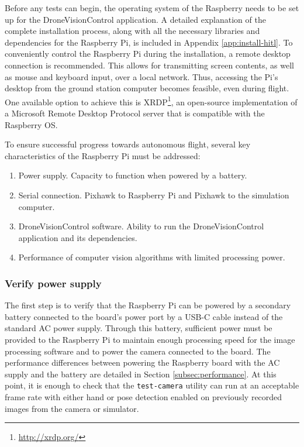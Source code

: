 Before any tests can begin, the operating system of the Raspberry needs to be set up for the DroneVisionControl application. A detailed explanation of the complete installation process, along with all the necessary libraries and dependencies for the Raspberry Pi, is included in Appendix \ref{app:install-hitl}. To conveniently control the Raspberry Pi during the installation, a remote desktop connection is recommended. This allows for transmitting screen contents, as well as mouse and keyboard input, over a local network. Thus, accessing the Pi's desktop from the ground station computer becomes feasible, even during flight. One available option to achieve this is XRDP\footnote{\url{http://xrdp.org/}}, an open-source implementation of a Microsoft Remote Desktop Protocol server that is compatible with the Raspberry OS.

To ensure successful progress towards autonomous flight, several key characteristics of the Raspberry Pi must be addressed:
\begin{enumerate}
    \item Power supply. Capacity to function when powered by a battery.
    \item Serial connection. Pixhawk to Raspberry Pi and Pixhawk to the simulation computer.
    \item DroneVisionControl software. Ability to run the DroneVisionControl application and its dependencies.
    \item Performance of computer vision algorithms with limited processing power.
\end{enumerate}


\subsubsection{Verify power supply}

The first step is to verify that the Raspberry Pi can be powered by a secondary battery connected to the board's power port by a USB-C cable instead of the standard AC power supply. Through this battery, sufficient power must be provided to the Raspberry Pi to maintain enough processing speed for the image processing software and to power the camera connected to the board. The performance differences between powering the Raspberry board with the AC supply and the battery are detailed in Section \ref{subsec:performance}. At this point, it is enough to check that the \texttt{test-camera} utility can run at an acceptable frame rate with either hand or pose detection enabled on previously recorded images from the camera or simulator.


